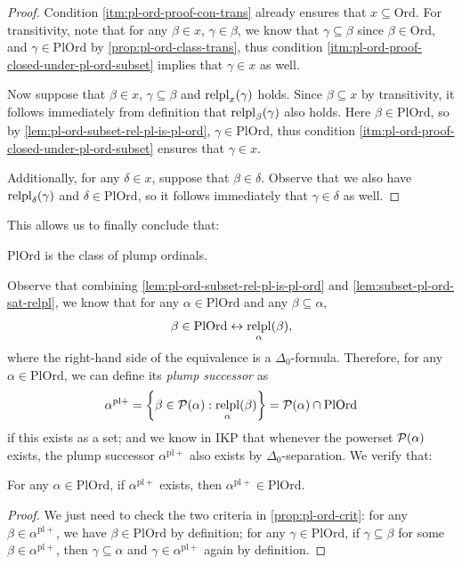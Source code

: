 \documentclass[12pt,openany]{book}
\theoremstyle{plain}
\theoremstyle{definition}
\newcommand\Pow{\mathcal{P}}
\DeclareMathOperator\relpl{relpl}
\newcommand\IKP{\mathrm{IKP}}
\newcommand\Ord{\mathrm{Ord}}
\newcommand\PlOrd{\mathrm{PlOrd}}
\newcommand\pl{\mathrm{pl}}
\newcommand\pls{{\pl +}}
\begin{document}
\begin{proof}
  Condition \ref{itm:pl-ord-proof-con-trans} already ensures that $x \subseteq \Ord$. For transitivity, note that for any $\beta \in x$, $\gamma \in \beta$, we know that $\gamma \subseteq \beta$ since $\beta \in \Ord$, and $\gamma \in \PlOrd$ by \autoref{prop:pl-ord-class-trans}, thus condition \ref{itm:pl-ord-proof-closed-under-pl-ord-subset} implies that $\gamma \in x$ as well.

  Now suppose that $\beta \in x$, $\gamma \subseteq \beta$ and $\relpl_x\mleft(\gamma\mright)$ holds. Since $\beta \subseteq x$ by transitivity, it follows immediately from definition that $\relpl_\beta\mleft(\gamma\mright)$ also holds. Here $\beta \in \PlOrd$, so by \autoref{lem:pl-ord-subset-rel-pl-is-pl-ord}, $\gamma \in \PlOrd$, thus condition \ref{itm:pl-ord-proof-closed-under-pl-ord-subset} ensures that $\gamma \in x$.

  Additionally, for any $\delta \in x$, suppose that $\beta \in \delta$. Observe that we also have $\relpl_\delta\mleft(\gamma\mright)$ and $\delta \in \PlOrd$, so it follows immediately that $\gamma \in \delta$ as well.
\end{proof}

This allows us to finally conclude that:
\begin{corollary}[$\IKP$]
  $\PlOrd$ is the class of plump ordinals.
\end{corollary}

Observe that combining \autoref{lem:pl-ord-subset-rel-pl-is-pl-ord} and \autoref{lem:subset-pl-ord-sat-relpl}, we know that for any $\alpha \in \PlOrd$ and any $\beta \subseteq \alpha$,
\[\beta \in \PlOrd \leftrightarrow \relpl_\alpha\mleft(\beta\mright),\]
where the right-hand side of the equivalence is a $\Delta_0$-formula. Therefore, for any $\alpha \in \PlOrd$, we can define its \emph{plump successor} as
\[\alpha^\pls = \left\{\beta \in \Pow\mleft(\alpha\mright) : \relpl_\alpha\mleft(\beta\mright)\right\} = \Pow\mleft(\alpha\mright) \cap \PlOrd\]
if this exists as a set; and we know in $\IKP$ that whenever the powerset $\Pow\mleft(\alpha\mright)$ exists, the plump successor $\alpha^\pls$ also exists by $\Delta_0$-separation. We verify that:
\begin{lemma}
  \label{lem:pl-successor-still-pl}
  For any $\alpha \in \PlOrd$, if $\alpha^\pls$ exists, then $\alpha^\pls \in \PlOrd$.
\end{lemma}

\begin{proof}
  We just need to check the two criteria in \autoref{prop:pl-ord-crit}: for any $\beta \in \alpha^\pls$, we have $\beta \in \PlOrd$ by definition; for any $\gamma \in \PlOrd$, if $\gamma \subseteq \beta$ for some $\beta \in \alpha^\pls$, then $\gamma \subseteq \alpha$ and $\gamma \in \alpha^\pls$ again by definition.
\end{proof}
\end{document}
